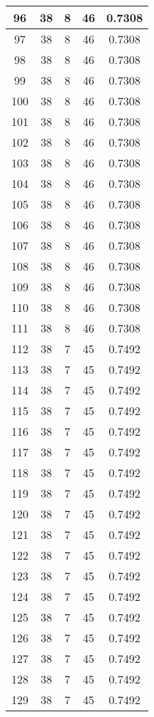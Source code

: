 \documentclass[letterpaper, 12pt]{article}
\begin{document}
\begin{longtable}{|c|c|c|c|c|}
\hline
96 & 38 & 8 & 46 & 0.7308 \\
\hline
97 & 38 & 8 & 46 & 0.7308 \\
\hline
98 & 38 & 8 & 46 & 0.7308 \\
\hline
99 & 38 & 8 & 46 & 0.7308 \\
\hline
100 & 38 & 8 & 46 & 0.7308 \\
\hline
101 & 38 & 8 & 46 & 0.7308 \\
\hline
102 & 38 & 8 & 46 & 0.7308 \\
\hline
103 & 38 & 8 & 46 & 0.7308 \\
\hline
104 & 38 & 8 & 46 & 0.7308 \\
\hline
105 & 38 & 8 & 46 & 0.7308 \\
\hline
106 & 38 & 8 & 46 & 0.7308 \\
\hline
107 & 38 & 8 & 46 & 0.7308 \\
\hline
108 & 38 & 8 & 46 & 0.7308 \\
\hline
109 & 38 & 8 & 46 & 0.7308 \\
\hline
110 & 38 & 8 & 46 & 0.7308 \\
\hline
111 & 38 & 8 & 46 & 0.7308 \\
\hline
112 & 38 & 7 & 45 & 0.7492 \\
\hline
113 & 38 & 7 & 45 & 0.7492 \\
\hline
114 & 38 & 7 & 45 & 0.7492 \\
\hline
115 & 38 & 7 & 45 & 0.7492 \\
\hline
116 & 38 & 7 & 45 & 0.7492 \\
\hline
117 & 38 & 7 & 45 & 0.7492 \\
\hline
118 & 38 & 7 & 45 & 0.7492 \\
\hline
119 & 38 & 7 & 45 & 0.7492 \\
\hline
120 & 38 & 7 & 45 & 0.7492 \\
\hline
121 & 38 & 7 & 45 & 0.7492 \\
\hline
122 & 38 & 7 & 45 & 0.7492 \\
\hline
123 & 38 & 7 & 45 & 0.7492 \\
\hline
124 & 38 & 7 & 45 & 0.7492 \\
\hline
125 & 38 & 7 & 45 & 0.7492 \\
\hline
126 & 38 & 7 & 45 & 0.7492 \\
\hline
127 & 38 & 7 & 45 & 0.7492 \\
\hline
128 & 38 & 7 & 45 & 0.7492 \\
\hline
129 & 38 & 7 & 45 & 0.7492 \\

\end{longtable}
\end{document}
